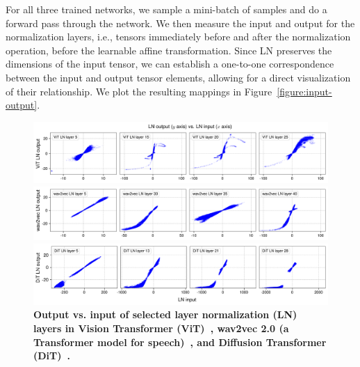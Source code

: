 For all three trained networks, we sample a mini-batch of samples and do a forward pass through the network. We then measure the input and output for the normalization layers, i.e., tensors immediately before and after the normalization operation, before the learnable affine transformation.
Since LN preserves the dimensions of the input tensor, we can establish a one-to-one correspondence between the input and output tensor elements, allowing for a direct visualization of their relationship. We plot the resulting mappings in Figure~\ref{figure:input-output}.


\begin{figure}[t]
\centering
\begin{minipage}{\textwidth}
\hspace*{-0.5cm}
\centering
\includegraphics[width=\textwidth]{figures/inout_vit.png}
\end{minipage}
\begin{minipage}{\textwidth}
\vspace*{-0.2cm}
\hspace*{-0.5cm}
  \centering
  \includegraphics[width=\textwidth]{figures/inout_w2v.png}
\end{minipage}
\begin{minipage}{\textwidth}
\vspace*{-0.2cm}
\hspace*{-0.5cm}
  \centering
  \includegraphics[width=\textwidth]{figures/inout_dit.png}
\end{minipage}
\caption{\textbf{Output vs. input of selected layer normalization (LN) layers in Vision Transformer (ViT)~\citep{dosovitskiy2020image}, wav2vec 2.0 (a Transformer model for speech)~\citep{baevski2020wav2vec}, and Diffusion Transformer (DiT)~\citep{peebles2023scalable}.} 
}
\end{figure}
